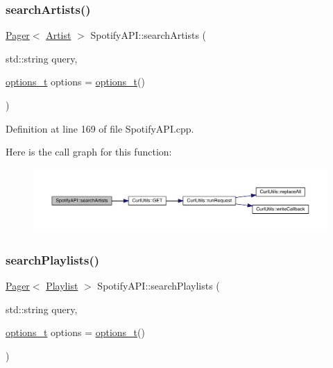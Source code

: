 \subsubsection{\texorpdfstring{search\+Artists()}{searchArtists()}}
{\footnotesize\ttfamily \mbox{\hyperlink{class_pager}{Pager}}$<$ \mbox{\hyperlink{class_artist}{Artist}} $>$ Spotify\+A\+P\+I\+::search\+Artists (\begin{DoxyParamCaption}\item[{std\+::string}]{query,  }\item[{\mbox{\hyperlink{_spotify_a_p_i_8h_a0ff5cac1a4007bb330b7d9939650c283}{options\+\_\+t}}}]{options = {\ttfamily \mbox{\hyperlink{_spotify_a_p_i_8h_a0ff5cac1a4007bb330b7d9939650c283}{options\+\_\+t}}()} }\end{DoxyParamCaption})}



Definition at line 169 of file Spotify\+A\+P\+I.\+cpp.

Here is the call graph for this function\+:
\nopagebreak
\begin{figure}[H]
\begin{center}
\leavevmode
\includegraphics[width=350pt]{class_spotify_a_p_i_aae86009494fbfe39fb6c253acaeb5819_cgraph}
\end{center}
\end{figure}
\mbox{\label{class_spotify_a_p_i_ab2f004b11a4179e588137fc3187f569c}} 
\subsubsection{\texorpdfstring{search\+Playlists()}{searchPlaylists()}}
{\footnotesize\ttfamily \mbox{\hyperlink{class_pager}{Pager}}$<$ \mbox{\hyperlink{class_playlist}{Playlist}} $>$ Spotify\+A\+P\+I\+::search\+Playlists (\begin{DoxyParamCaption}\item[{std\+::string}]{query,  }\item[{\mbox{\hyperlink{_spotify_a_p_i_8h_a0ff5cac1a4007bb330b7d9939650c283}{options\+\_\+t}}}]{options = {\ttfamily \mbox{\hyperlink{_spotify_a_p_i_8h_a0ff5cac1a4007bb330b7d9939650c283}{options\+\_\+t}}()} }\end{DoxyParamCaption})}



